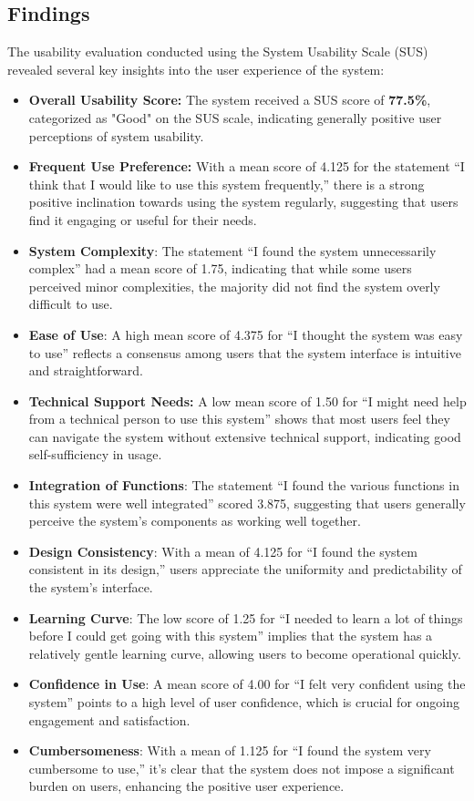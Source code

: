\documentclass[conference]{IEEEtran}
\begin{document}
    \subsection{Findings}

    The usability evaluation conducted using the System Usability Scale (SUS) revealed several key insights into the user experience of the system:
    
    \begin{itemize}
        \item \textbf{Overall Usability Score:} The system received a SUS score of \textbf{77.5\%}, categorized as "Good" on the SUS scale, indicating generally positive user perceptions of system usability.
        \item \textbf{Frequent Use Preference:} With a mean score of 4.125 for the statement ``I think that I would like to use this system frequently,'' there is a strong positive inclination towards using the system regularly, suggesting that users find it engaging or useful for their needs.
        \item \textbf{System Complexity}: The statement ``I found the system unnecessarily complex'' had a mean score of 1.75, indicating that while some users perceived minor complexities, the majority did not find the system overly difficult to use.
        \item \textbf{Ease of Use}: A high mean score of 4.375 for ``I thought the system was easy to use'' reflects a consensus among users that the system interface is intuitive and straightforward.
        \item \textbf{Technical Support Needs:} A low mean score of 1.50 for ``I might need help from a technical person to use this system'' shows that most users feel they can navigate the system without extensive technical support, indicating good self-sufficiency in usage.
        \item \textbf{Integration of Functions}: The statement ``I found the various functions in this system were well integrated'' scored 3.875, suggesting that users generally perceive the system's components as working well together.
        \item \textbf{Design Consistency}: With a mean of 4.125 for ``I found the system consistent in its design,'' users appreciate the uniformity and predictability of the system's interface.
        \item \textbf{Learning Curve}: The low score of 1.25 for ``I needed to learn a lot of things before I could get going with this system'' implies that the system has a relatively gentle learning curve, allowing users to become operational quickly.
        \item \textbf{Confidence in Use}: A mean score of 4.00 for ``I felt very confident using the system'' points to a high level of user confidence, which is crucial for ongoing engagement and satisfaction.
        \item \textbf{Cumbersomeness}: With a mean of 1.125 for ``I found the system very cumbersome to use,'' it's clear that the system does not impose a significant burden on users, enhancing the positive user experience.
    \end{itemize}
    
\end{document}
